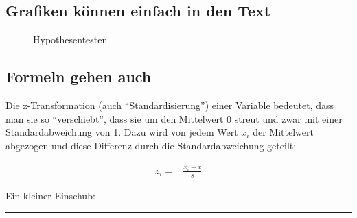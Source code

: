 \documentclass[
  10pt,
  letterpaper,
  a4paper, twoside]{scrreprt}
\begin{document}
\subsection{Grafiken können einfach in den
Text}\label{grafiken-kuxf6nnen-einfach-in-den-text}

\begin{figure}


\caption{\label{fig-Hypothesen}Hypothesentesten}

\end{figure}%

\subsection{Formeln gehen auch}\label{formeln-gehen-auch}

Die z-Transformation (auch \enquote{Standardisierung}) einer Variable
bedeutet, dass man sie so \enquote{verschiebt}, dass sie um den
Mittelwert 0 streut und zwar mit einer Standardabweichung von 1. Dazu
wird von jedem Wert \(x_i\) der Mittelwert abgezogen und diese Differenz
durch die Standardabweichung geteilt:

\begin{align}    
  z_i= & \frac{x_i-\bar{x}}{s} \label{eq:z-Transformation} 
\end{align}

Ein kleiner Einschub:

\begin{center}\rule{0.5\linewidth}{0.5pt}\end{center}
\end{document}
